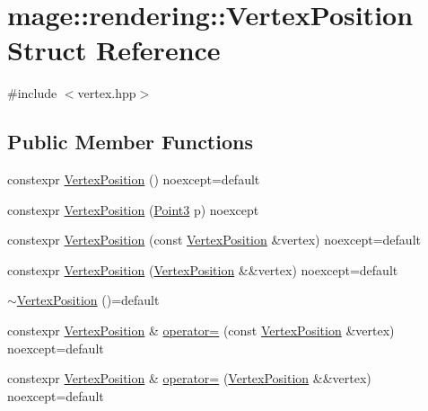 \hypertarget{structmage_1_1rendering_1_1_vertex_position}{}\section{mage\+:\+:rendering\+:\+:Vertex\+Position Struct Reference}
\label{structmage_1_1rendering_1_1_vertex_position}


{\ttfamily \#include $<$vertex.\+hpp$>$}

\subsection*{Public Member Functions}
\begin{DoxyCompactItemize}
\item 
constexpr \hyperlink{structmage_1_1rendering_1_1_vertex_position_a9df4fa391d76a89997e8b512fc3142d2}{Vertex\+Position} () noexcept=default
\item 
constexpr \hyperlink{structmage_1_1rendering_1_1_vertex_position_afeb47bb7062e42f0bdaf7039abc4b7cb}{Vertex\+Position} (\hyperlink{structmage_1_1_point3}{Point3} p) noexcept
\item 
constexpr \hyperlink{structmage_1_1rendering_1_1_vertex_position_a2f93e143d8e24b4de51eea1e73e8ad62}{Vertex\+Position} (const \hyperlink{structmage_1_1rendering_1_1_vertex_position}{Vertex\+Position} \&vertex) noexcept=default
\item 
constexpr \hyperlink{structmage_1_1rendering_1_1_vertex_position_ad886c8131e6cf96dac4a716907b532ad}{Vertex\+Position} (\hyperlink{structmage_1_1rendering_1_1_vertex_position}{Vertex\+Position} \&\&vertex) noexcept=default
\item 
\hyperlink{structmage_1_1rendering_1_1_vertex_position_afe5c10d9422cd3b37acecd3691361057}{$\sim$\+Vertex\+Position} ()=default
\item 
constexpr \hyperlink{structmage_1_1rendering_1_1_vertex_position}{Vertex\+Position} \& \hyperlink{structmage_1_1rendering_1_1_vertex_position_a9b25981be6c9b46f6c8c4dbc0c143fc6}{operator=} (const \hyperlink{structmage_1_1rendering_1_1_vertex_position}{Vertex\+Position} \&vertex) noexcept=default
\item 
constexpr \hyperlink{structmage_1_1rendering_1_1_vertex_position}{Vertex\+Position} \& \hyperlink{structmage_1_1rendering_1_1_vertex_position_a1bb8da5039eae002fbfc446a5a4d8c4a}{operator=} (\hyperlink{structmage_1_1rendering_1_1_vertex_position}{Vertex\+Position} \&\&vertex) noexcept=default
\end{DoxyCompactItemize}

